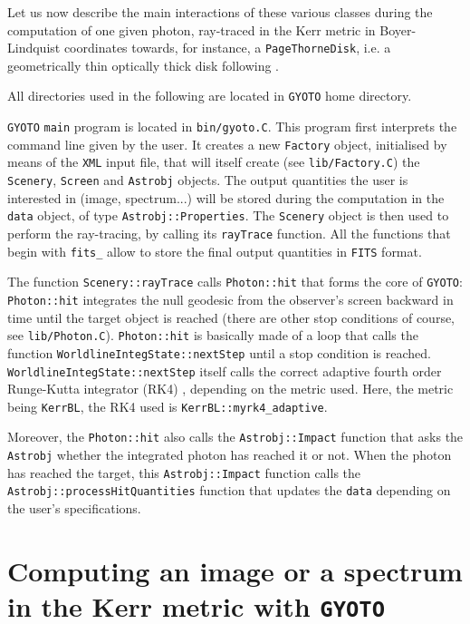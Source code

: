 \documentclass[a4paper,12pt]{article}
\begin{document}
\begin{sloppypar} %
Let us now describe the main interactions of these various classes during the computation of one given photon, ray-traced in the Kerr metric in Boyer-Lindquist coordinates towards, for instance, a \texttt{PageThorneDisk}, i.e. a geometrically thin optically thick disk following \citet{page74}.

All directories used in the following are located in \texttt{GYOTO} home directory.

\texttt{GYOTO} \texttt{main} program is located in \texttt{bin/gyoto.C}. This program first interprets the command line given by the user. It creates a new \texttt{Factory} object, initialised by means of the \texttt{XML} input file, that will itself create (see \texttt{lib/Factory.C}) the \texttt{Scenery}, \texttt{Screen} and \texttt{Astrobj} objects. The output quantities the user is interested in (image, spectrum...) will be stored during the computation in the \texttt{data} object, of type \texttt{Astrobj::Properties}. The \texttt{Scenery} object is then used to perform the ray-tracing, by calling its \texttt{rayTrace} function. All the functions that begin with \texttt{fits\_} allow to store the final output quantities in \texttt{FITS} format.

The function \texttt{Scenery::rayTrace} calls \texttt{Photon::hit} that forms the core of \texttt{GYOTO}: \texttt{Photon::hit} integrates the null geodesic from the observer's screen backward in time until the target object is reached (there are other stop conditions of course, see \texttt{lib/Photon.C}). \texttt{Photon::hit} is basically made of a loop that calls the function \texttt{WorldlineIntegState::nextStep} until a stop condition is reached.  \texttt{WorldlineIntegState::nextStep} itself calls the correct adaptive fourth order Runge-Kutta integrator (RK4) , depending on the metric used. Here, the metric being \texttt{KerrBL}, the RK4 used is \texttt{KerrBL::myrk4\_adaptive}. 

Moreover, the \texttt{Photon::hit} also calls the \texttt{Astrobj::Impact} function that asks the \texttt{Astrobj} whether the integrated photon has reached it or not. When the photon has reached the target, this \texttt{Astrobj::Impact} function calls the \texttt{Astrobj::processHitQuantities} function that updates the \texttt{data} depending on the user's specifications. 
\end{sloppypar}

\section{Computing an image or a spectrum in the Kerr metric with \texttt{GYOTO}}
\label{kerr}
\end{document}
